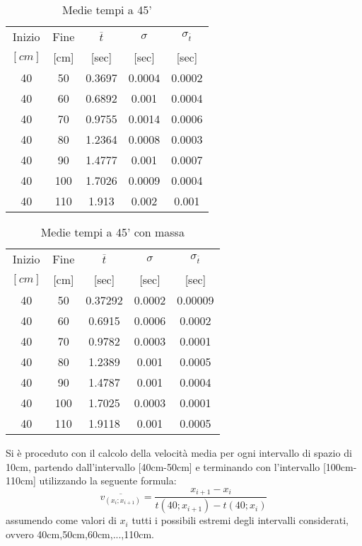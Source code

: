 \documentclass[a4paper,11pt,oneside]{article}
\begin{document}
\begin{table}[h!]
\centering
\begin{tabular}{c c|c c c}
\toprule
Inizio&Fine&$\overline{t}$&$\sigma$&$\sigma_{\overline{t}}$\\
$[\si{cm}]$&[cm]&[sec]&[sec]&[sec]\\ \midrule
40 & 50  & 0.3697  & 0.0004 & 0.0002 \\
40 & 60  & 0.6892 & 0.001  & 0.0004 \\
40 & 70  & 0.9755 & 0.0014  & 0.0006 \\
40 & 80  & 1.2364 & 0.0008 & 0.0003 \\
40 & 90  & 1.4777 & 0.001  & 0.0007 \\
40 & 100 & 1.7026 & 0.0009 & 0.0004 \\
40 & 110 & 1.913 & 0.002  & 0.001 \\
\bottomrule
\end{tabular}
    \caption{Medie tempi a 45'}
    \label{tab:45_primi}
\end{table}

\begin{table}[h!]
\centering
\begin{tabular}{cc|ccc}
\hline
Inizio&Fine&$\overline{t}$&$\sigma$&$\sigma_{\overline{t}}$\\
$[\si{cm}]$&[cm]&[sec]&[sec]&[sec]\\
\toprule
40 & 50  & 0.37292 & 0.0002 & 0.00009 \\
40 & 60  & 0.6915  & 0.0006 & 0.0002 \\

40 & 70  & 0.9782 & 0.0003 & 0.0001 \\
40 & 80  & 1.2389 & 0.001  & 0.0005 \\

40 & 90  & 1.4787  & 0.001   & 0.0004 \\

40 & 100 & 1.7025 & 0.0003 & 0.0001 \\

40 & 110 & 1.9118 & 0.001  & 0.0005 \\
\bottomrule
\end{tabular}
    \caption{Medie tempi a 45' con massa}
    \label{tab:d45_primi}
\end{table}


Si è proceduto con il calcolo della velocità media per ogni intervallo di spazio di 10cm, partendo dall'intervallo [40cm-50cm] e terminando con l'intervallo [100cm-110cm] utilizzando la seguente formula:
\begin{equation*}
    \overline{v_{(x_i;x_{i+1})}}=\frac{x_{i+1}-x_i}{t(40;x_{i+1})-t(40;x_i)}
\end{equation*}
assumendo come valori di $x_i$ tutti i possibili estremi degli intervalli considerati, ovvero 40cm,50cm,60cm,...,110cm.
\end{document}
